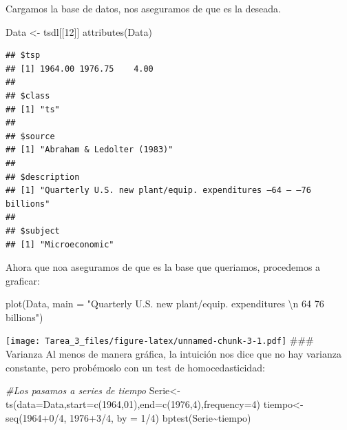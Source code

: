 \documentclass[
]{article}
\newenvironment{Shaded}{\begin{snugshade}}{\end{snugshade}}
\newcommand{\AttributeTok}[1]{\textcolor[rgb]{0.77,0.63,0.00}{#1}}
\newcommand{\CommentTok}[1]{\textcolor[rgb]{0.56,0.35,0.01}{\textit{#1}}}
\newcommand{\DecValTok}[1]{\textcolor[rgb]{0.00,0.00,0.81}{#1}}
\newcommand{\FunctionTok}[1]{\textcolor[rgb]{0.00,0.00,0.00}{#1}}
\newcommand{\NormalTok}[1]{#1}
\newcommand{\OtherTok}[1]{\textcolor[rgb]{0.56,0.35,0.01}{#1}}
\newcommand{\SpecialCharTok}[1]{\textcolor[rgb]{0.00,0.00,0.00}{#1}}
\newcommand{\StringTok}[1]{\textcolor[rgb]{0.31,0.60,0.02}{#1}}
\begin{document}
Cargamos la base de datos, nos aseguramos de que es la deseada.

\begin{Shaded}
\begin{Highlighting}[]
\NormalTok{Data }\OtherTok{\textless{}{-}}\NormalTok{ tsdl[[}\DecValTok{12}\NormalTok{]]}
\FunctionTok{attributes}\NormalTok{(Data)}
\end{Highlighting}
\end{Shaded}

\begin{verbatim}
## $tsp
## [1] 1964.00 1976.75    4.00
## 
## $class
## [1] "ts"
## 
## $source
## [1] "Abraham & Ledolter (1983)"
## 
## $description
## [1] "Quarterly U.S. new plant/equip. expenditures –64 – –76 billions"
## 
## $subject
## [1] "Microeconomic"
\end{verbatim}

Ahora que noa aseguramos de que es la base que queriamos, procedemos a
graficar:

\begin{Shaded}
\begin{Highlighting}[]
\FunctionTok{plot}\NormalTok{(Data, }\AttributeTok{main =} \StringTok{"Quarterly U.S. new plant/equip. expenditures }\SpecialCharTok{\textbackslash{}n}\StringTok{ 64 76 billions"}\NormalTok{)}
\end{Highlighting}
\end{Shaded}

\texttt{[image: Tarea\_3\_files/figure-latex/unnamed-chunk-3-1.pdf]}
\#\#\# Varianza Al menos de manera gráfica, la intuición nos dice que no
hay varianza constante, pero probémoslo con un test de homocedasticidad:

\begin{Shaded}
\begin{Highlighting}[]
\CommentTok{\#Los pasamos a series de tiempo}
\NormalTok{Serie}\OtherTok{\textless{}{-}}\FunctionTok{ts}\NormalTok{(}\AttributeTok{data=}\NormalTok{Data,}\AttributeTok{start=}\FunctionTok{c}\NormalTok{(}\DecValTok{1964}\NormalTok{,}\DecValTok{01}\NormalTok{),}\AttributeTok{end=}\FunctionTok{c}\NormalTok{(}\DecValTok{1976}\NormalTok{,}\DecValTok{4}\NormalTok{),}\AttributeTok{frequency=}\DecValTok{4}\NormalTok{)}
\NormalTok{tiempo}\OtherTok{\textless{}{-}}\FunctionTok{seq}\NormalTok{(}\DecValTok{1964}\SpecialCharTok{+}\DecValTok{0}\SpecialCharTok{/}\DecValTok{4}\NormalTok{, }\DecValTok{1976}\SpecialCharTok{+}\DecValTok{3}\SpecialCharTok{/}\DecValTok{4}\NormalTok{, }\AttributeTok{by =} \DecValTok{1}\SpecialCharTok{/}\DecValTok{4}\NormalTok{)}
\FunctionTok{bptest}\NormalTok{(Serie}\SpecialCharTok{\textasciitilde{}}\NormalTok{tiempo)}
\end{Highlighting}
\end{Shaded}
\end{document}
